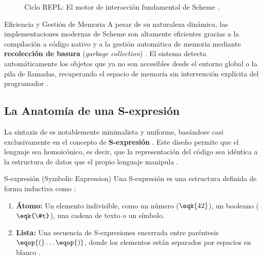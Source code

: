 \begin{figure}[htbp]
    \centering
    \caption{Ciclo REPL: El motor de interacción fundamental de Scheme \cite{SICP, HtDP}.}
    \label{fig:repl_flow}
\end{figure}

\begin{observacion}{Eficiencia y Gestión de Memoria}
A pesar de su naturaleza dinámica, las implementaciones modernas de Scheme son altamente eficientes gracias a la compilación a código nativo y a la gestión automática de memoria mediante \textbf{recolección de basura} (\textit{garbage collection}) \cite{SICP, HtDP}. El sistema detecta automáticamente los objetos que ya no son accesibles desde el entorno global o la pila de llamadas, recuperando el espacio de memoria sin intervención explícita del programador \cite{SICP}.
\end{observacion}

\subsection{La Anatomía de una S-expresión}
\label{subsec:4_2_2_sexpresion}

La sintaxis de  es notablemente minimalista y uniforme, basándose casi exclusivamente en el concepto de \textbf{S-expresión} \cite{SICP}. Este diseño permite que el lenguaje sea homoicónico, es decir, que la representación del código sea idéntica a la estructura de datos que el propio lenguaje manipula \cite{SICP, HtDP}.

\begin{definicion}{S-expresión (Symbolic Expression)}
Una S-expresión es una estructura definida de forma inductiva como \cite{SICP}:
\begin{enumerate}
    \item \textbf{Átomo:} Un elemento indivisible, como un número ($\eqk{42}$), un booleano ($\eqk{\#t}$), una cadena de texto o un símbolo.
    \item \textbf{Lista:} Una secuencia de S-expresiones encerrada entre paréntesis $\eqop{(} \dots \eqop{)}$, donde los elementos están separados por espacios en blanco \cite{SICP}.
\end{enumerate}
\end{definicion}


